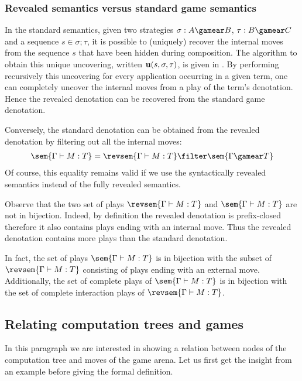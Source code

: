 \subsubsection{Revealed semantics versus standard game semantics}
\label{subsec:relating_revealed_and_standard_denotation}

In the standard semantics, given two strategies $\sigma : A
\gamear B$, $\tau : B \gamear C$ and a sequence $s \in
\sigma ; \tau$, it is possible to (uniquely) recover the
internal moves from the sequence $s$ that have been hidden during composition. The algorithm to obtain this unique uncovering, written ${\bf u}(s, \sigma, \tau)$, is given in \cite[part II]{hylandong_pcf}. By performing recursively this uncovering for every application occurring in a given term, one can completely uncover the internal moves from a play of the term's denotation.
Hence the revealed denotation can be recovered from the standard game denotation.

Conversely, the standard denotation can be obtained from the revealed denotation by filtering out all the internal moves:
\begin{eqnarray}
 \sem{\Gamma \vdash M : T} = \revsem{\Gamma \vdash M : T} \filter \sem{\Gamma \gamear T} \label{eqn:int_std_gamsem}
\end{eqnarray}
Of course, this equality remains valid if we use the syntactically revealed semantics instead of the fully revealed semantics.


Observe that the two set of plays $\revsem{\Gamma \vdash M : T}$ and $\sem{\Gamma \vdash M : T}$ are not in bijection.  Indeed, by definition the revealed denotation is prefix-closed therefore it also contains plays ending with an internal move. Thus the revealed denotation contains more plays than the standard denotation.

In fact, the set of plays $\sem{\Gamma \vdash M : T}$ is in bijection with the subset of $\revsem{\Gamma \vdash M : T}$ consisting of plays ending with an external move. Additionally, the set of complete plays of $\sem{\Gamma \vdash M : T}$ is in bijection with the set of complete interaction plays of $\revsem{\Gamma \vdash M : T}$.


\subsection{Relating computation trees and games}
In this paragraph we are interested in showing a relation between nodes of the computation tree and moves of the game arena.
Let us first get the insight from an example before giving the formal definition.
